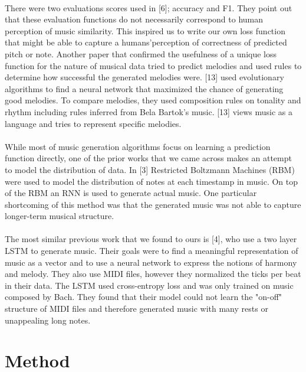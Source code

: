 \documentclass[final]{article}
\begin{document}
\paragraph{}There were two evaluations scores used in [6]; accuracy and F1.  They point out that these evaluation functions do not necessarily correspond to human perception of music similarity.  This inspired us to write our own loss function that might be able to capture a humans\rq perception of correctness of predicted pitch or note.  Another paper that confirmed the usefulness of a unique loss function for the nature of musical data tried to predict melodies and used rules to determine how successful the generated melodies were.  [13] used evolutionary algorithms to find a neural network that maximized the chance of generating good melodies.  To compare melodies, they used composition rules on tonality and rhythm including rules inferred from Bela Bartok\rq s music.  [13] views music as a language and tries to represent specific melodies.
\paragraph{}While most of music generation algorithms focus on learning a prediction function directly, one of the prior works that we came across makes an attempt to model the distribution of data.  In [3] Restricted Boltzmann Machines (RBM) were used to model the distribution of notes at each timestamp in music.  On top of the RBM an RNN is used to generate actual music.  One particular shortcoming of this method was that the generated music was not able to capture longer-term musical structure.
\paragraph{}The most similar previous work that we found to ours is [4], who use a two layer LSTM to generate music.  Their goals were to find a meaningful representation of music as a vector and to use a neural network to express the notions of harmony and melody.  They also use MIDI files, however they normalized the ticks per beat in their data.  The LSTM used cross-entropy loss and was only trained on music composed by Bach.  They found that their model could not learn the "on-off" structure of MIDI files and therefore generated music with many rests or unappealing long notes.

\section{Method}
\end{document}
